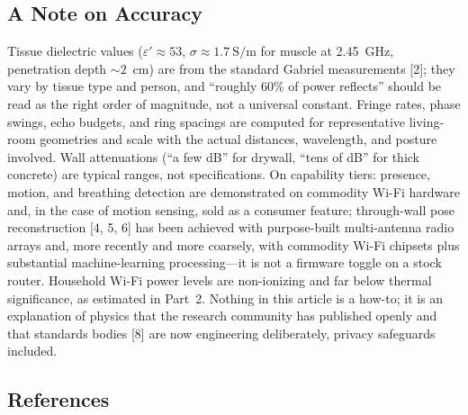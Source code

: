 \documentclass[11pt, letterpaper]{article}
\begin{document}
\vspace{1cm}

\subsection*{A Note on Accuracy}

Tissue dielectric values ($\varepsilon' \approx 53$, $\sigma \approx 1.7\ \text{S/m}$ for muscle at 2.45~GHz, penetration depth $\sim 2$~cm) are from the standard Gabriel measurements [2]; they vary by tissue type and person, and ``roughly 60\% of power reflects'' should be read as the right order of magnitude, not a universal constant. Fringe rates, phase swings, echo budgets, and ring spacings are computed for representative living-room geometries and scale with the actual distances, wavelength, and posture involved. Wall attenuations (``a few dB'' for drywall, ``tens of dB'' for thick concrete) are typical ranges, not specifications. On capability tiers: presence, motion, and breathing detection are demonstrated on commodity Wi-Fi hardware and, in the case of motion sensing, sold as a consumer feature; through-wall pose reconstruction [4, 5, 6] has been achieved with purpose-built multi-antenna radio arrays and, more recently and more coarsely, with commodity Wi-Fi chipsets plus substantial machine-learning processing---it is not a firmware toggle on a stock router. Household Wi-Fi power levels are non-ionizing and far below thermal significance, as estimated in Part~2. Nothing in this article is a how-to; it is an explanation of physics that the research community has published openly and that standards bodies [8] are now engineering deliberately, privacy safeguards included.

\subsection*{References}
\end{document}
